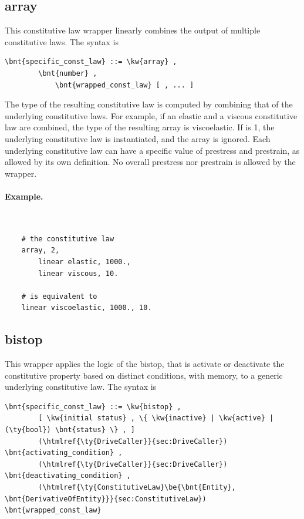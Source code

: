 \subsection{array}
This constitutive law wrapper linearly combines the output
of multiple constitutive laws.
The syntax is
\begin{Verbatim}[commandchars=\\\{\}]
    \bnt{specific_const_law} ::= \kw{array} ,
        \bnt{number} ,
            \bnt{wrapped_const_law} [ , ... ]
\end{Verbatim}
The type of the resulting constitutive law is computed by combining
that of the underlying constitutive laws.
For example, if an elastic and a viscous constitutive law are combined,
the type of the resulting array is viscoelastic.
If  is 1, the underlying constitutive law is instantiated,
and the array is ignored.
Each underlying constitutive law can have a specific value
of prestress and prestrain, as allowed by its own definition.
No overall prestress nor prestrain is allowed by the  wrapper.

\paragraph{Example.} \
\begin{verbatim}
    # the constitutive law
    array, 2,
        linear elastic, 1000.,
        linear viscous, 10.

    # is equivalent to
    linear viscoelastic, 1000., 10.
\end{verbatim}


\subsection{bistop}
This wrapper applies the logic of the bistop, that is activate or deactivate
the constitutive property based on distinct conditions, with memory,
to a generic underlying constitutive law.
The syntax is
\begin{Verbatim}[commandchars=\\\{\}]
    \bnt{specific_const_law} ::= \kw{bistop} ,
        [ \kw{initial status} , \{ \kw{inactive} | \kw{active} | (\ty{bool}) \bnt{status} \} , ]
        (\htmlref{\ty{DriveCaller}}{sec:DriveCaller}) \bnt{activating_condition} ,
        (\htmlref{\ty{DriveCaller}}{sec:DriveCaller}) \bnt{deactivating_condition} ,
        (\htmlref{\ty{ConstitutiveLaw}\be{\bnt{Entity}, \bnt{DerivativeOfEntity}}}{sec:ConstitutiveLaw}) \bnt{wrapped_const_law}
\end{Verbatim}


